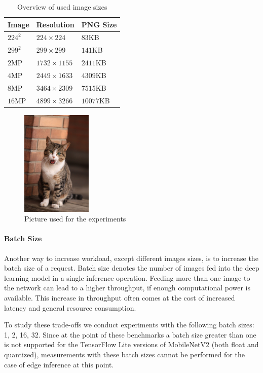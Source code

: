 \begin{table}[!htb]
\centering
\caption{Overview of used image sizes}
\label{table:imagesOverview}
\begin{tabular}{@{}lll@{}}
\toprule
Image   & Resolution       & PNG Size  \\ \midrule
$224^2$ & $224\times224$   & $83$KB    \\
$299^2$ & $299\times299$   & $141$KB   \\
$2$MP   & $1732\times1155$ & $2411$KB  \\
$4$MP   & $2449\times1633$ & $4309$KB  \\
$8$MP   & $3464\times2309$ & $7515$KB  \\
$16$MP  & $4899\times3266$ & $10077$KB \\ \bottomrule
\end{tabular}
\end{table}
\begin{figure}[!htb]
\centering
\includegraphics[width=0.3\textwidth]{./Bilder/European_cat_compressed.jpg}
\caption{Picture used for the experiments \cite{cat}}
\label{fig:cat}
\end{figure}
\paragraph{Batch Size}
Another way to increase workload, except different images sizes, is to increase the batch size of a request.
Batch size denotes the number of images fed into the deep learning model in a single inference operation. 
Feeding more than one image to the network can lead to a higher throughput, if enough computational power is available. This increase in throughput often comes at the cost of increased latency and general resource consumption.

To study these trade-offs we conduct experiments with the following batch sizes: 1, 2, 16, 32. Since at the point of these benchmarks a batch size greater than one is not supported for the TensorFlow Lite versions of MobileNetV2 (both float and quantized), measurements with these batch sizes cannot be performed for the case of edge inference at this point.

